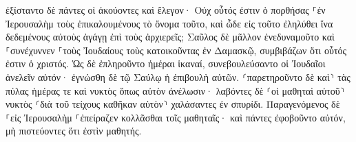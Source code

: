 \documentclass{openreader}
\begin{document}
ἐξίσταντο δὲ πάντες οἱ ἀκούοντες καὶ ἔλεγον· Οὐχ οὗτός ἐστιν ὁ πορθήσας ⸀ἐν Ἰερουσαλὴμ τοὺς ἐπικαλουμένους τὸ ὄνομα τοῦτο, καὶ ὧδε εἰς τοῦτο ἐληλύθει ἵνα δεδεμένους αὐτοὺς ἀγάγῃ ἐπὶ τοὺς ἀρχιερεῖς; 
Σαῦλος δὲ μᾶλλον ἐνεδυναμοῦτο καὶ ⸀συνέχυννεν ⸀τοὺς Ἰουδαίους τοὺς κατοικοῦντας ἐν Δαμασκῷ, συμβιβάζων ὅτι οὗτός ἐστιν ὁ χριστός. 
Ὡς δὲ ἐπληροῦντο ἡμέραι ἱκαναί, συνεβουλεύσαντο οἱ Ἰουδαῖοι ἀνελεῖν αὐτόν· 
ἐγνώσθη δὲ τῷ Σαύλῳ ἡ ἐπιβουλὴ αὐτῶν. ⸂παρετηροῦντο δὲ καὶ⸃ τὰς πύλας ἡμέρας τε καὶ νυκτὸς ὅπως αὐτὸν ἀνέλωσιν· 
λαβόντες δὲ ⸂οἱ μαθηταὶ αὐτοῦ⸃ νυκτὸς ⸂διὰ τοῦ τείχους καθῆκαν αὐτὸν⸃ χαλάσαντες ἐν σπυρίδι. 
Παραγενόμενος δὲ ⸀εἰς Ἰερουσαλὴμ ⸀ἐπείραζεν κολλᾶσθαι τοῖς μαθηταῖς· καὶ πάντες ἐφοβοῦντο αὐτόν, μὴ πιστεύοντες ὅτι ἐστὶν μαθητής. 
\end{document}
